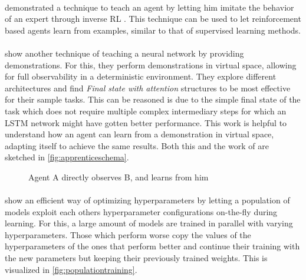 \documentclass[12pt,a4paper]{article}
\begin{document}
\paragraph{\citeauthor{NG2004Apprentice}} demonstrated a technique to teach an agent by letting him imitate the behavior
of an expert through inverse \ac{RL} \cite{NG2000InvReinf}. This technique can be used to let reinforcement based agents
learn from examples, similar to that of supervised learning methods.



\paragraph{\citeauthor{duan2017one}} show another technique of teaching a neural network by providing demonstrations.
For this, they perform demonstrations in virtual space, allowing for full observability in a deterministic environment.
They explore different architectures and find \emph{Final state with attention} structures to be most effective for
their sample tasks. This can be reasoned is due to the simple final state of the task which does not require multiple
complex intermediary steps for which an LSTM network might have gotten better performance.  This work is helpful to
understand how an agent can learn from a demonstration in virtual space, adapting itself to achieve the same results.
Both this and the work of \citeauthor{NG2004Apprentice} are sketched in \autoref{fig:apprenticeschema}.

\begin{figure}[] \centering {} \caption{Agent A directly observes B, and learns from him} \label{fig:apprenticeschema}
\end{figure}


\paragraph{\citeauthor{jaderberg2017population}} show an efficient way of optimizing hyperparameters by letting a
population of models exploit each others hyperparameter configurations on-the-fly during learning. For this, a large
amount of models are trained in parallel with varying hyperparameters. Those which perform worse copy the values of the
hyperparameters of the ones that perform better and continue their training with the new parameters but keeping their
previously trained weights. This is visualized in \autoref{fig:populationtraining}.
\end{document}
